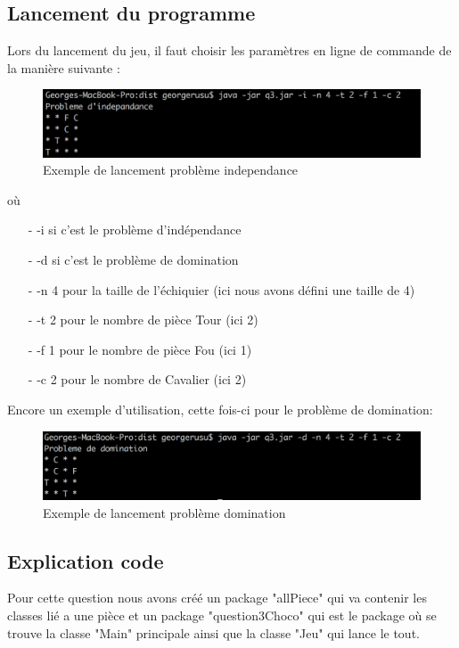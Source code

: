 \documentclass[a4paper,10pt]{article}
\begin{document}
\subsection{Lancement du programme}
\par Lors du lancement du jeu, il faut choisir les paramètres en ligne de commande de la manière suivante :
\begin{figure}[!h]
  \includegraphics[width=\linewidth]{img/q3.png}
  \caption{Exemple de lancement problème independance}
\end{figure}
\par où
\begin{enumerate}
	\item[-] -i si c'est le problème d'indépendance
	\item[-] -d si c'est le problème de domination
	\item[-] -n 4 pour la taille de l'échiquier (ici nous avons défini une taille de 4)
	\item[-] -t 2 pour le nombre de pièce Tour (ici 2)
	\item[-] -f 1 pour le nombre de pièce Fou (ici 1)
	\item[-] -c 2 pour le nombre de Cavalier (ici 2)
\end{enumerate}

Encore un exemple d'utilisation, cette fois-ci pour le problème de domination:
\begin{figure}[!h]
  \includegraphics[width=\linewidth]{img/q31.png}
  \caption{Exemple de lancement problème domination}
\end{figure}
\subsection{Explication code}
\par Pour cette question nous avons créé un package "allPiece" qui va contenir les classes lié a une pièce et un package "question3Choco" qui est le package où se trouve la classe "Main" principale ainsi que la classe "Jeu" qui lance le tout. 
\end{document}

